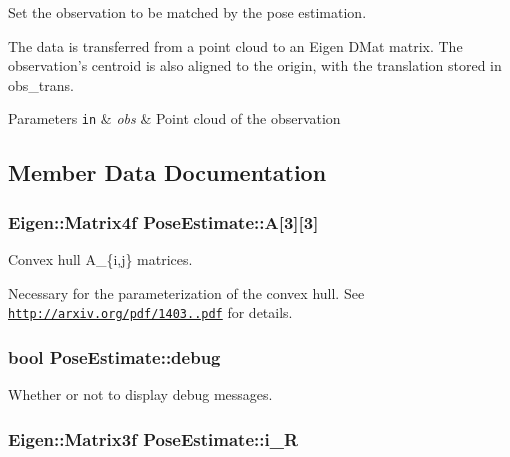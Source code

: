 \-Set the observation to be matched by the pose estimation. 

\-The data is transferred from a point cloud to an \-Eigen \-D\-Mat matrix. \-The observation's centroid is also aligned to the origin, with the translation stored in obs\-\_\-trans. 
\begin{DoxyParams}[1]{\-Parameters}
\mbox{\tt in}  & {\em obs} & \-Point cloud of the observation \\
\hline
\end{DoxyParams}


\subsection{\-Member \-Data \-Documentation}
\hypertarget{classPoseEstimate_ad4827d1aca3b4730d6e8c0cf4e96deca}{
\subsubsection[{\-A}]{\setlength{\rightskip}{0pt plus 5cm}\-Eigen\-::\-Matrix4f {\bf \-Pose\-Estimate\-::\-A}\mbox{[}3\mbox{]}\mbox{[}3\mbox{]}}}\label{classPoseEstimate_ad4827d1aca3b4730d6e8c0cf4e96deca}


\-Convex hull \-A\-\_\-\{i,j\} matrices. 

\-Necessary for the parameterization of the convex hull. \-See \href{http://arxiv.org/pdf/1403.4914.pdf}{\tt http\-://arxiv.\-org/pdf/1403..\-pdf} for details. \hypertarget{classPoseEstimate_a81f2cf4c423887225557200a6da5744e}{
\subsubsection[{debug}]{\setlength{\rightskip}{0pt plus 5cm}bool {\bf \-Pose\-Estimate\-::debug}}}\label{classPoseEstimate_a81f2cf4c423887225557200a6da5744e}


\-Whether or not to display debug messages. 

\hypertarget{classPoseEstimate_ac6b2c23e4121d00a14d4a8245cad86ab}{
\subsubsection[{i\-\_\-\-R}]{\setlength{\rightskip}{0pt plus 5cm}\-Eigen\-::\-Matrix3f {\bf \-Pose\-Estimate\-::i\-\_\-\-R}}}\label{classPoseEstimate_ac6b2c23e4121d00a14d4a8245cad86ab}


